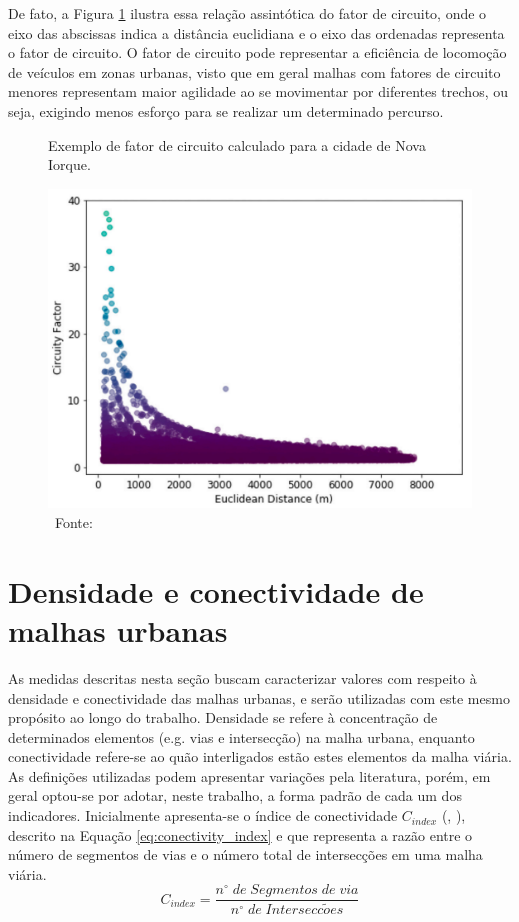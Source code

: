 De fato, a Figura \ref{fig:FC_julia_artigo} ilustra essa relação assintótica do fator de circuito, onde o eixo das abscissas indica a distância euclidiana e o eixo das ordenadas representa o fator de circuito.
O fator de circuito pode representar a eficiência de locomoção de veículos em zonas urbanas, visto que em geral malhas com fatores de circuito menores representam maior agilidade ao se movimentar por diferentes trechos, ou seja, exigindo menos esforço para se realizar um determinado percurso.

\begin{figure}[H]
    \centering
    \caption{Exemplo de fator de circuito calculado para a cidade de Nova Iorque.}
    \includegraphics[width=.4\linewidth]{images/2_revisao/julia_fc.png}
    \caption*{\ Fonte: }
    \label{fig:FC_julia_artigo}
\end{figure}

\section{Densidade e conectividade de malhas urbanas} \label{sec:DensConectBiblio}

As medidas descritas nesta seção buscam caracterizar valores com respeito à densidade e conectividade das malhas urbanas, e serão utilizadas com este mesmo propósito ao longo do trabalho.
Densidade se refere à concentração de determinados elementos (e.g. vias e intersecção) na malha urbana, enquanto conectividade refere-se ao quão interligados estão estes elementos da malha viária.
As definições utilizadas podem apresentar variações pela literatura, porém, em geral optou-se por adotar, neste trabalho, a forma padrão de cada um dos indicadores.
Inicialmente apresenta-se o índice de conectividade $C_{index}$ (, \citeyear{Marshall_metrics}), descrito na Equação \ref{eq:conectivity_index} e que representa a razão entre o número de segmentos de vias e o número total de intersecções em uma malha viária.
%
\begin{equation} \label{eq:conectivity_index}
    C_{index} = \frac{n^{\circ}\;de\;Segmentos\;de\;via}{n^{\circ}\;de\;Intersecc\tilde{o}es}
\end{equation}

